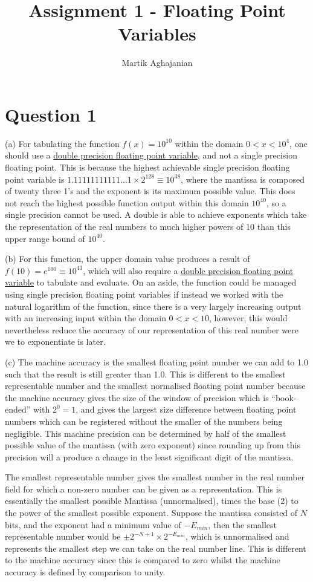 \documentclass{article}
\title{Assignment 1 - Floating Point Variables}
\author{Martik Aghajanian}
\date{}
\begin{document}
\maketitle
\section{Question 1}

(a) For tabulating the function $f(x)=10^{10}$ within the domain $0<x<10^4$, one should use a \underline{double precision floating point variable}, and not a single precision floating point. This is because the highest achievable single precision floating point variable is $1.11111111111...1\times{2^{128}}\equiv{10^{38}}$, where the mantissa is composed of twenty three 1's and the exponent is its maximum possible value. This does not reach the highest possible function output within this domain $10^{40}$, so a single precision cannot be used. A double is able to achieve exponents which take the representation of the real numbers to much higher powers of 10 than this upper range bound of $10^{40}$. 


\noindent (b) For this function, the upper domain value produces a result of $f(10)=e^{100}\equiv{10^{43}}$, which will also require a \underline{ double precision floating point variable} to tabulate and evaluate. On an aside, the function could be managed using single precision floating point variables if instead we worked with the natural logarithm of the function, since there is a very largely increasing output with an increasing input within the domain $0<x<10$, however, this would nevertheless reduce the accuracy of our representation of this real number were we to exponentiate is later.

\noindent (c) The machine accuracy is the smallest floating point number we can add to 1.0 such that the result is still greater than 1.0. This is different to the smallest representable number and the smallest normalised floating point number because the machine accuracy gives the size of the window of precision which is “book-ended” with $2^0=1$, and gives the largest size difference between floating point numbers which can be registered without the smaller of the numbers being negligible. This machine precision can be determined by half of the smallest possible value of the mantissa (with zero exponent) since rounding up from this precision will a produce a change in the least significant digit of the mantissa.

The smallest representable number gives the smallest number in the real number field for which a non-zero number can be given as a representation. This is essentially the smallest possible Mantissa (unnormalised), times the base (2) to the power of the smallest possible exponent. Suppose the mantissa consisted of $N$ bits, and the exponent had a minimum value of $-E_{min}$, then the smallest representable number would be $\pm 2^{-N+1}\times{2^{-E_{min}}}$, which is unnormalised and represents the smallest step we can take on the real number line. This is different to the machine accuracy since this is compared to zero whilst the machine accuracy is defined by comparison to unity. 
\end{document}

